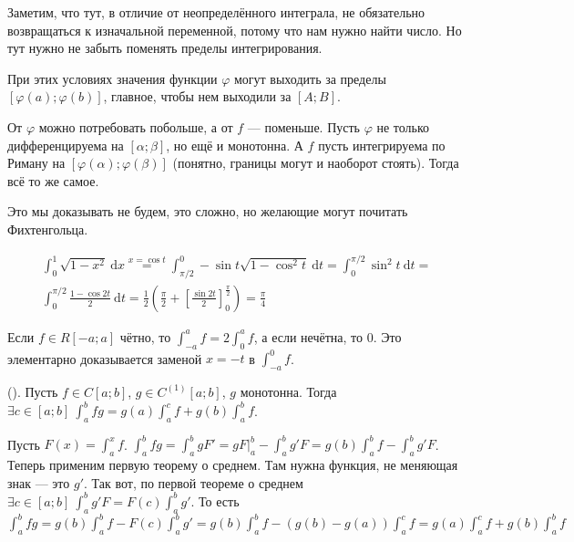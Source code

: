 \documentclass{article}
\begin{document}
\begin{itemize}
\begin{Comment}
            Заметим, что тут, в отличие от неопределённого интеграла, не обязательно возвращаться к изначальной переменной, потому что нам нужно найти число. Но тут нужно не забыть поменять пределы интегрирования.
        \end{Comment}
        \begin{comment}
            $\int_a^bf~\mathrm dg=fg\big|_a^b-\int_a^bg~\mathrm df$.
        \end{comment}
        \begin{Comment}
            При этих условиях значения функции $\varphi$ могут выходить за пределы $[\varphi(a);\varphi(b)]$, главное, чтобы нем выходили за $[A;B]$.
        \end{Comment}
        \thm От $\varphi$ можно потребовать побольше, а от $f$ --- поменьше. Пусть $\varphi$ не только дифференцируема на $[\alpha;\beta]$, но ещё и монотонна. А $f$ пусть интегрируема по Риману на $[\varphi(\alpha);\varphi(\beta)]$ (понятно, границы могут и наоборот стоять). Тогда всё то же самое.
        \begin{Proof}
            Это мы доказывать не будем, это сложно, но желающие могут почитать Фихтенгольца.
        \end{Proof}
        \begin{Example}
            \[
            \begin{split}
                \int_0^1\sqrt{1-x^2}~\mathrm dx\overset{x=\cos t}=\int_{\pi/2}^0-\sin t\sqrt{1-\cos^2t}~\mathrm dt=\int_0^{\pi/2}\sin^2t~\mathrm dt=\\
                \int_0^{\pi/2}\frac{1-\cos2t}2~\mathrm dt=\frac12\left(\frac\pi2+\left[\frac{\sin2t}2\right]_0^{\frac\pi2}\right)=\frac\pi4
            \end{split}
            \]
        \end{Example}
        \begin{Example}
            Если $f\in R[-a;a]$ чётно, то $\int_{-a}^af=2\int_0^af$, а если нечётна, то 0. Это элементарно доказывается заменой $x=-t$ в $\int_{-a}^0f$.
        \end{Example}
        \thm {} (). Пусть $f\in C[a;b]$, $g\in C^{(1)}[a;b]$, $g$ монотонна. Тогда $\exists c\in[a;b]~\int_a^bfg=g(a)\int_a^cf+g(b)\int_a^bf$.
        \begin{Proof}
            Пусть $F(x)=\int_a^xf$. $\int_a^bfg=\int_a^bgF'=gF\big|_a^b-\int_a^bg'F=g(b)\int_a^bf-\int_a^bg'F$. Теперь применим первую теорему о среднем. Там нужна функция, не меняющая знак --- это $g'$. Так вот, по первой теореме о среднем $\exists c\in[a;b]~\int_a^bg'F=F(c)\int_a^bg'$. То есть $\int_a^bfg=g(b)\int_a^bf-F(c)\int_a^bg'=g(b)\int_a^bf-(g(b)-g(a))\int_a^cf=g(a)\int_a^cf+g(b)\int_a^bf$

\end{Proof}
\end{itemize}
\end{document}
